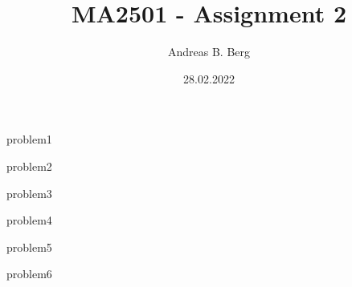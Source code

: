 \documentclass{article}
\begin{document}
\mainmatter

\title{MA2501 - Assignment 2}
\author{Andreas B. Berg}
\date{28.02.2022}
\maketitle
\thispagestyle{fancy}

{problem1}

\pagebreak
{problem2}

\pagebreak
{problem3}

\pagebreak
{problem4}

\pagebreak
{problem5}

\pagebreak
{problem6}

\end{document}

